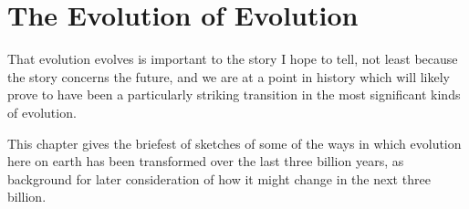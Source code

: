 \chapter{The Evolution of Evolution}\label{EvolutionOfEvolution}

That evolution evolves is important to the story I hope to tell, not least because the story concerns the future, and we are at a point in history which will likely prove to have been a particularly striking transition in the most significant kinds of evolution.

This chapter gives the briefest of sketches of some of the ways in which evolution here on earth has been transformed over the last three billion years, as background for later consideration of how it might change in the next three billion.
